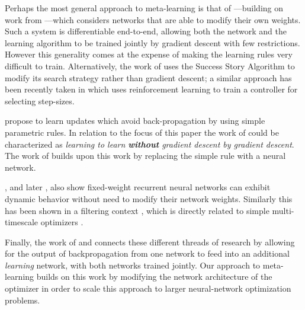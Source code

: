 Perhaps the most general approach to meta-learning is that of
\cite{schmidhuber:1992, schmidhuber:1993}---building on work from
\citep{schmidhuber:1987}---which considers networks that are able to modify
their own weights. Such a system is differentiable end-to-end, allowing both
the network and the learning algorithm to be trained jointly by gradient
descent with few restrictions.  However this generality comes at the expense of
making the learning rules very difficult to train.  Alternatively, the work of
\cite{schmidhuber:1997} uses the Success Story Algorithm to modify its search
strategy rather than gradient descent; a similar approach has been recently
taken in \cite{daniel:2016} which uses reinforcement learning to train a
controller for selecting step-sizes.

\cite{bengio:1990, bengio:1995} propose to learn updates which avoid
back-propagation by using simple parametric rules. In relation to the focus of
this paper the work of \citeauthor{bengio:1990} could be characterized as
\emph{learning to learn \textbf{without} gradient descent by gradient descent}.
The work of \cite{runarsson:2000} builds upon this work by replacing the simple
rule with a neural network.

\cite{cotter:1990}, and later \cite{younger:1999}, also show fixed-weight
recurrent neural networks can exhibit dynamic behavior without need to modify
their network weights. Similarly this has been shown in a filtering context
\citep[e.g.][]{feldkamp:1998}, which is directly related to simple
multi-timescale optimizers \citep{sutton:1992, schraudolph:1999}.

Finally, the work of \cite{younger:2001} and \cite{hochreiter:2001} connects
these different threads of research by allowing for the output of
backpropagation from one network to feed into an additional \emph{learning}
network, with both networks trained jointly. Our approach to meta-learning
builds on this work by modifying the network architecture of the optimizer in
order to scale this approach to larger neural-network optimization problems.

